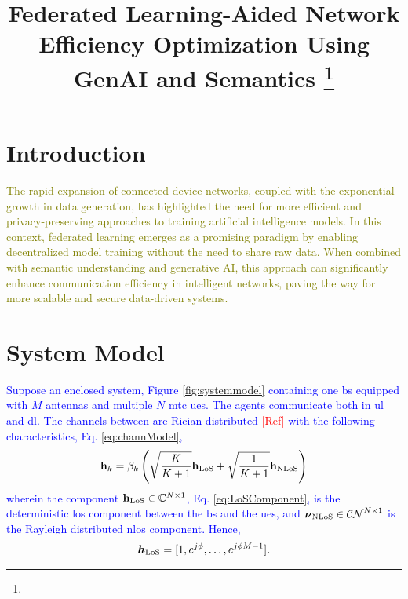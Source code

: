 \documentclass[conference,twocolumn]{IEEEtran}
\title{{Federated Learning-Aided Network Efficiency Optimization Using GenAI and Semantics}
\thanks{
}
}
\author{
\IEEEauthorblockN{
    {%
    {Gian Pedro Rodrigues}}\IEEEauthorrefmark{1},
    {%
    {Herman L. dos Santos}}\IEEEauthorrefmark{1},%
        }
        \IEEEauthorblockA{
        \IEEEauthorrefmark{1}\textit{\small Academic Department of Electrical, Federal University of Technology - Paraná}, Cornélio Procópio, Brazil\\
        \small E-mail: hermansantos@utfpr.edu.br,%
        }
}
\newcommand{\gpr}{\textcolor{olive}}
\newcommand{\colb}{\textcolor{blue}}
\newcommand{\colr}{\textcolor{red}}
\begin{document}
\maketitle

\thispagestyle{plain}
\pagestyle{plain}

\begin{abstract}

\end{abstract}
\begin{IEEEkeywords} 

\end{IEEEkeywords}


\section{Introduction}
\gpr{The rapid expansion of connected device networks, coupled with the exponential growth in data generation, has highlighted the need for more efficient and privacy-preserving approaches to training artificial intelligence models. In this context, federated learning emerges as a promising paradigm by enabling decentralized model training without the need to share raw data. When combined with semantic understanding and generative AI, this approach can significantly enhance communication efficiency in intelligent networks, paving the way for more scalable and secure data-driven systems.}

\section{System Model}
\colb{Suppose an enclosed system, Figure \ref{fig:systemmodel} containing one \gls{bs} equipped with $M$ antennas and multiple $N$ \gls{mtc} \glspl{ue}. The agents communicate both in \gls{ul} and \gls{dl}. The channels between are Rician distributed \colr{[Ref]} with the following characteristics, Eq. \eqref{eq:channModel},
\begin{equation}
    {\bf h}_k = \beta_k\left(\sqrt{\frac{K}{K+1}}{\bf h}_{\rm LoS} + \sqrt{\frac{1}{K+1}}{\bf h}_{\rm NLoS}\right)
    \label{eq:channModel}
\end{equation}
wherein the component ${\bf h}_{\rm LoS} \in \mathbb{C}^{N\times 1}$, Eq. \eqref{eq:LoSComponent}, is the deterministic \gls{los} component between the \gls{bs} and the \glspl{ue}, and $\boldsymbol{\nu}_{\rm NLoS} \in \mathcal{CN}^{N\times 1}$ is the Rayleigh distributed \gls{nlos} component. Hence,
%
\begin{equation}
    \boldsymbol{h}_{\rm LoS} = [1, e^{j\phi }, \dots, e^{j\phi M-1}].
    \label{eq:LoSComponent}
\end{equation}
}
\end{document}
